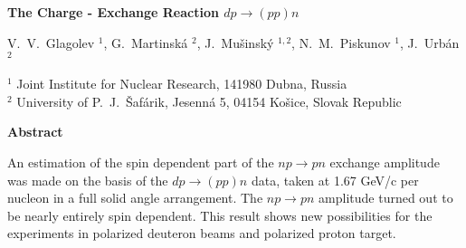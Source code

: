 \thispagestyle{empty}

\begin{center}
\Large \bf {The Charge - Exchange Reaction $dp \to (pp)n$}
\end{center}

\begin{center}
\noindent \large\textrm {V.~V.~Glagolev $^{1}$, G.~Martinsk\'{a} $^{2}$,
J.~Mu\v{s}insk\'{y} $^{1, 2}$, N.~M.~Piskunov $^{1}$, J.~Urb\'{a}n $^{2}$}
\end{center}

\vspace{0.5cm}
\noindent
\small {$^{1}$ Joint Institute for Nuclear Research, 141980 Dubna, Russia \\
$^{2}$ University of P.~J.~\v{S}af\'{a}rik, Jesenn\'{a} 5, 04154 Ko\v{s}ice,
Slovak Republic \\}

\begin{center} {\bf Abstract} \end{center}

An estimation of the spin dependent part of the $np \to pn$ exchange amplitude
was made on the basis of the $dp \to (pp)n$ data, taken at 1.67 GeV/c per
nucleon in a full solid angle arrangement. The $np \to pn$ amplitude turned
out to be nearly entirely spin dependent. This result shows new possibilities
for the experiments in polarized deuteron beams and polarized proton target.
